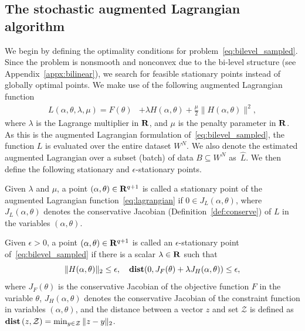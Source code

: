 \subsection{The stochastic augmented Lagrangian algorithm}
\label{sec:training_procedure}
We begin by defining the optimality conditions for problem~\eqref{eq:bilevel_sampled}. Since the problem is nonsmooth and nonconvex due to the bi-level structure (see Appendix~\ref{appx:bilinear}), we search for feasible stationary points instead of globally optimal points. We make use of the following augmented Lagrangian function 
\begin{equation}
\label{eq:lagrangian}
	\begin{aligned}
		L(\alpha,\theta,\lambda,\mu) = F(\theta) &+ \lambda H(\alpha,\theta) + \frac{\mu}{2}\|H(\alpha,\theta)\|^2,
	\end{aligned}
\end{equation}
where $\lambda$ is the Lagrange multiplier in  ${\mathbf R}$, and $\mu$ is the penalty parameter in ${\mathbf R}$.
As this is the augmented Lagrangian formulation of~\eqref{eq:bilevel_sampled}, the function $L$ is evaluated over the entire dataset $W^N$. 
We also denote the estimated augmented Lagrangian over a subset (batch) of data $B \subseteq W^N$ as~$\hat{L}$.
We then define the following stationary and $\epsilon$-stationary points. 
\begin{definition}
\label{def:stationary_lag}
Given $\lambda$ and $\mu$, a point $(\alpha,\theta)\in {\mathbf R}^{q+1}$ is called a stationary point of the augmented Lagrangian function~\eqref{eq:lagrangian} if $0 \in J_L(\alpha,\theta)$, where $J_L(\alpha,\theta)$ denotes the conservative Jacobian (Definition~\ref{def:conserve}) of $L$ in the variables $(\alpha,\theta)$.
\end{definition}

\begin{definition}
\label{def:eps_stationary}
Given $\epsilon > 0$, a point $(\alpha,\theta)\in {\mathbf R}^{q+1}$ is called an $\epsilon$-stationary point of~\eqref{eq:bilevel_sampled} if there is a scalar $\lambda \in {\mathbf R}$ such that
\begin{equation}
\label{eq:stationary}
\|H(\alpha,\theta)\|_2 \leq \epsilon, \quad \mathop{\bf dist{}}(0, J_F(\theta) + \lambda J_{H}(\alpha,\theta)) \leq \epsilon,
\end{equation}
where $J_F(\theta)$ is the conservative Jacobian of the objective function $F$ in the variable $\theta$, $J_{H}(\alpha,\theta)$
denotes the conservative Jacobian of the constraint function in variables $(\alpha,\theta)$, and the distance between a vector $z$ and set $\mathcal{Z}$ is defined as $\mathop{\bf dist{}}{(z,\mathcal{Z})} = \min_{y \in \mathcal{Z}} \| z - y \|_2$.
\end{definition}

